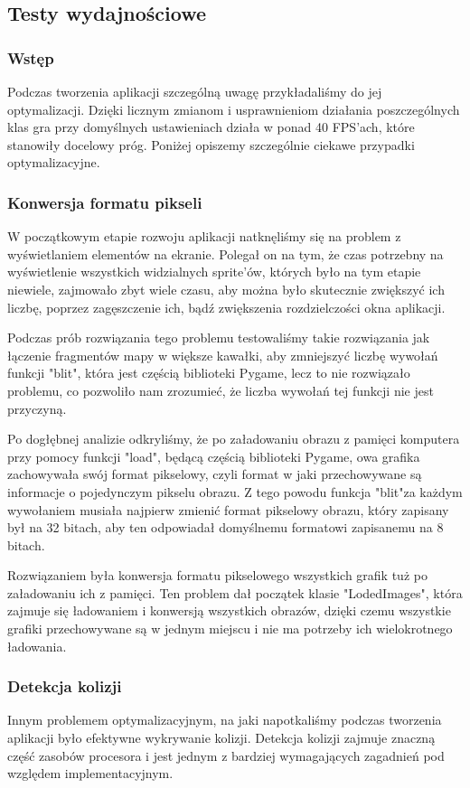\documentclass{article}
\begin{document}
\subsection{Testy wydajnościowe}
\subsubsection{Wstęp}
Podczas tworzenia aplikacji szczególną uwagę przykładaliśmy do jej optymalizacji. Dzięki licznym zmianom i usprawnieniom działania poszczególnych klas gra przy domyślnych ustawieniach działa w ponad 40 FPS'ach, które stanowiły docelowy próg. Poniżej opiszemy szczególnie ciekawe przypadki optymalizacyjne.
\subsubsection{Konwersja formatu pikseli}
W początkowym etapie rozwoju aplikacji natknęliśmy się na problem z wyświetlaniem elementów na ekranie. Polegał on na tym, że czas potrzebny na wyświetlenie wszystkich widzialnych sprite'ów, których było na tym etapie niewiele, zajmowało zbyt wiele czasu, aby można było skutecznie zwiększyć ich liczbę, poprzez zagęszczenie ich, bądź zwiększenia rozdzielczości okna aplikacji.

Podczas prób rozwiązania tego problemu testowaliśmy takie rozwiązania jak łączenie fragmentów mapy w większe kawałki, aby zmniejszyć liczbę wywołań funkcji "blit", która jest częścią biblioteki Pygame, lecz to nie rozwiązało problemu, co pozwoliło nam zrozumieć, że liczba wywołań tej funkcji nie jest przyczyną.

Po dogłębnej analizie odkryliśmy, że po załadowaniu obrazu z pamięci komputera przy pomocy funkcji "load", będącą częścią biblioteki Pygame, owa grafika zachowywała swój format pikselowy\cite{wiki:pix}, czyli format w jaki przechowywane są informacje o pojedynczym pikselu obrazu. Z tego powodu funkcja "blit"\space za każdym wywołaniem musiała najpierw zmienić format pikselowy obrazu, który zapisany był na 32 bitach, aby ten odpowiadał domyślnemu formatowi zapisanemu na 8 bitach.

Rozwiązaniem była konwersja formatu pikselowego wszystkich grafik tuż po załadowaniu ich z pamięci. Ten problem dał początek klasie "LodedImages", która zajmuje się ładowaniem i konwersją wszystkich obrazów, dzięki czemu wszystkie grafiki przechowywane są w jednym miejscu i nie ma potrzeby ich wielokrotnego ładowania.

\subsubsection{Detekcja kolizji}
Innym problemem optymalizacyjnym, na jaki napotkaliśmy podczas tworzenia aplikacji było efektywne wykrywanie kolizji. Detekcja kolizji zajmuje znaczną część zasobów procesora i jest jednym z bardziej wymagających zagadnień pod względem implementacyjnym.
\end{document}
